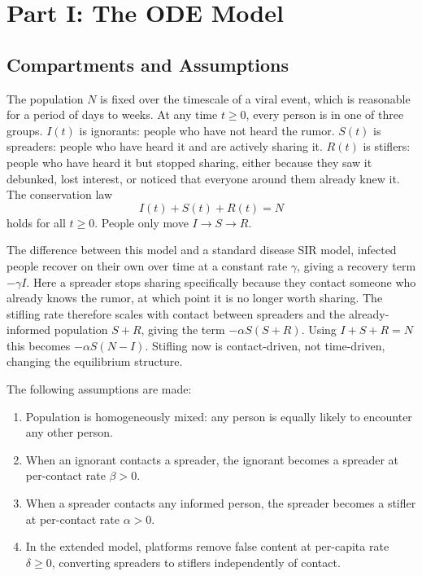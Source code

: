 \documentclass[12pt]{article}
\begin{document}
\section{Part I: The ODE Model}

\subsection{Compartments and Assumptions}

The population $N$ is fixed over the timescale of a viral event, which is
reasonable for a period of days to weeks. At any time $t \geq 0$, every
person is in one of three groups. $I(t)$ is ignorants: people who have not
heard the rumor. $S(t)$ is spreaders: people who have heard it and are
actively sharing it. $R(t)$ is stiflers: people who have heard it but
stopped sharing, either because they saw it debunked, lost interest, or
noticed that everyone around them already knew it. The conservation law
$$I(t) + S(t) + R(t) = N$$
holds for all $t \geq 0$. People only move $I \to S \to R$.

The difference between this model and a standard disease SIR model, infected people recover on their
own over time at a constant rate $\gamma$, giving a recovery term $-\gamma
I$. Here a spreader stops sharing specifically because they
contact someone who already knows the rumor, at which point it is no longer
worth sharing. The stifling rate therefore scales with contact between
spreaders and the already-informed population $S + R$, giving the term
$-\alpha S(S + R)$. Using $I + S + R = N$ this becomes $-\alpha S(N - I)$.
Stifling now is contact-driven, not time-driven, changing the
equilibrium structure.

The following assumptions are made:
\begin{enumerate}
    \item Population is homogeneously mixed: any person is equally likely to
    encounter any other person.
    \item When an ignorant contacts a spreader, the ignorant becomes a
    spreader at per-contact rate $\beta > 0$.
    \item When a spreader contacts any informed person, the spreader becomes
    a stifler at per-contact rate $\alpha > 0$.
    \item In the extended model, platforms remove false content at per-capita
    rate $\delta \geq 0$, converting spreaders to stiflers independently of
    contact.
\end{enumerate}
\end{document}
